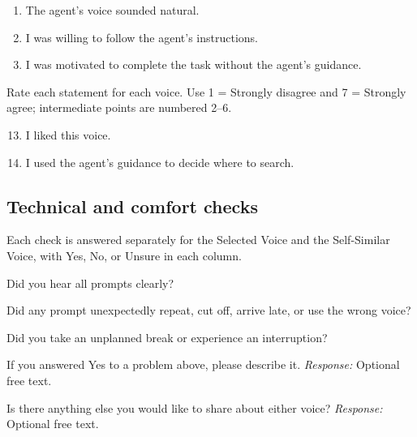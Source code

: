 \begin{enumerate}
\begin{minipage}[t]{\linewidth}
I relied on the spoken hints when deciding where to search next.
\end{minipage}
\item \begin{minipage}[t]{\linewidth}
The agent's voice sounded natural.
\end{minipage}
\item \begin{minipage}[t]{\linewidth}
I was willing to follow the agent's instructions.
\end{minipage}
\item \begin{minipage}[t]{\linewidth}
I was motivated to complete the task without the agent's guidance.
\end{minipage}
\end{enumerate}
\par\medskip\noindent
Rate each statement for each voice. Use 1 = Strongly disagree and 7 = Strongly agree; intermediate points are numbered 2--6.
\begin{enumerate}\setcounter{enumi}{12}
\item \begin{minipage}[t]{\linewidth}
I liked this voice.
\end{minipage}
\item \begin{minipage}[t]{\linewidth}
I used the agent's guidance to decide where to search.
\end{minipage}
\end{enumerate}
\subsection{Technical and comfort checks}
Each check is answered separately for the Selected Voice and the Self-Similar Voice, with Yes, No, or Unsure in each column.
\par\medskip\noindent
Did you hear all prompts clearly?
\par\nopagebreak {}
\par\medskip\noindent
Did any prompt unexpectedly repeat, cut off, arrive late, or use the wrong voice?
\par\nopagebreak {}
\par\medskip\noindent
Did you take an unplanned break or experience an interruption?
\par\nopagebreak {}
\par\medskip\noindent
If you answered Yes to a problem above, please describe it.
\textit{Response:} Optional free text.\surveywrite
\par\medskip\noindent
Is there anything else you would like to share about either voice?
\textit{Response:} Optional free text.\surveywrite
